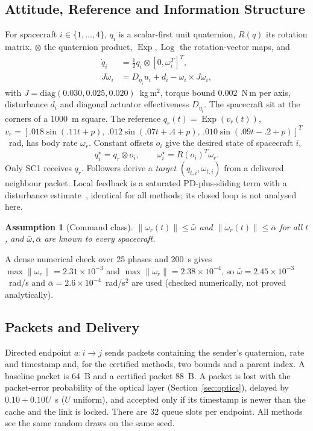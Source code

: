 \documentclass[journal]{IEEEtran}
\DeclareMathOperator{\Log}{Log}
\DeclareMathOperator{\Exp}{Exp}
\newtheorem{assumption}{Assumption}
\begin{document}
\subsection{Attitude, Reference and Information Structure}
For spacecraft $i\in\{1,\dots,4\}$, $q_i$ is a scalar-first unit quaternion, $R(q)$ its rotation matrix, $\otimes$ the quaternion product, $\Exp,\Log$ the rotation-vector maps, and
\begin{align}
\dot q_i &= \tfrac12 q_i\otimes[0,\omega_i^T]^T,\\
J\dot\omega_i &= D_{\eta_i}u_i+d_i-\omega_i\times J\omega_i,
\end{align}
with $J=\mathrm{diag}(0.030,0.025,0.020)$~kg\,m$^2$, torque bound $0.002$~N\,m per axis, disturbance $d_i$ and diagonal actuator effectiveness $D_{\eta_i}$. The spacecraft sit at the corners of a 1000~m square. The reference $q_r(t)=\Exp(v_r(t))$, $v_r=[.018\sin(.11t+p),\,.012\sin(.07t+.4+p),\,.010\sin(.09t-.2+p)]^T$~rad, has body rate $\omega_r$. Constant offsets $o_i$ give the desired state of spacecraft $i$,
\begin{equation}
q_i^\star=q_r\otimes o_i,\qquad \omega_i^\star=R(o_i)^T\omega_r .
\end{equation}
Only SC1 receives $q_r$. Followers derive a \emph{target} $(q_{t,i},\omega_{t,i})$ from a delivered neighbour packet. Local feedback is a saturated PD-plus-sliding term with a disturbance estimate~\cite{liu2018}, identical for all methods; its closed loop is not analysed here.

\begin{assumption}[Command class]\label{as:ref}
$\|\omega_r(t)\|\le\bar\omega$ and $\|\dot\omega_r(t)\|\le\bar\alpha$ for all $t$, and $\bar\omega,\bar\alpha$ are known to every spacecraft.
\end{assumption}
A dense numerical check over 25 phases and 200~s gives $\max\|\omega_r\|=2.31\times10^{-3}$ and $\max\|\dot\omega_r\|=2.38\times10^{-4}$, so $\bar\omega=2.45\times10^{-3}$~rad/s and $\bar\alpha=2.6\times10^{-4}$~rad/s$^2$ are used (checked numerically, not proved analytically).

\subsection{Packets and Delivery}
Directed endpoint $a:i\to j$ sends packets containing the sender's quaternion, rate and timestamp and, for the certified methods, two bounds and a parent index. A baseline packet is 64~B and a certified packet 88~B. A packet is lost with the packet-error probability of the optical layer (Section~\ref{sec:optics}), delayed by $0.10+0.10U$~s ($U$ uniform), and accepted only if its timestamp is newer than the cache and the link is locked. There are 32 queue slots per endpoint. All methods see the same random draws on the same seed.
\end{document}
